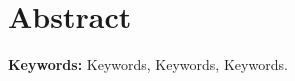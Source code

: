 \chapter{Abstract}

\textbf{Keywords: }{Keywords, Keywords, Keywords.}
\clearpage
\thispagestyle{plain}